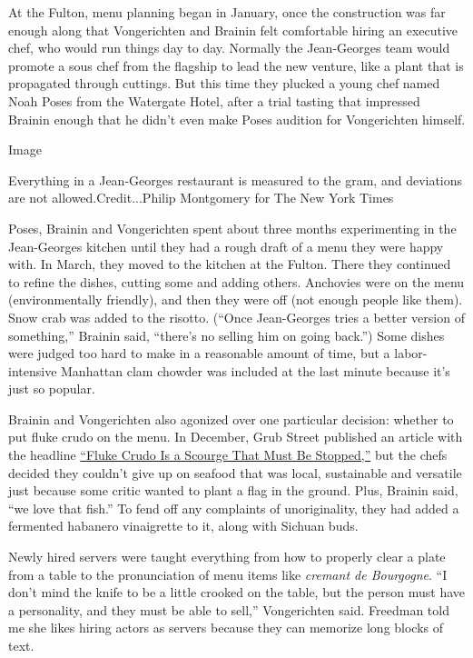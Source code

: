 At the Fulton, menu planning began in January, once the construction was
far enough along that Vongerichten and Brainin felt comfortable hiring
an executive chef, who would run things day to day. Normally the
Jean-Georges team would promote a sous chef from the flagship to lead
the new venture, like a plant that is propagated through cuttings. But
this time they plucked a young chef named Noah Poses from the Watergate
Hotel, after a trial tasting that impressed Brainin enough that he
didn't even make Poses audition for Vongerichten himself.

Image

Everything in a Jean-Georges restaurant is measured to the gram, and
deviations are not allowed.Credit...Philip Montgomery for The New York
Times

Poses, Brainin and Vongerichten spent about three months experimenting
in the Jean-Georges kitchen until they had a rough draft of a menu they
were happy with. In March, they moved to the kitchen at the Fulton.
There they continued to refine the dishes, cutting some and adding
others. Anchovies were on the menu (environmentally friendly), and then
they were off (not enough people like them). Snow crab was added to the
risotto. (``Once Jean-Georges tries a better version of something,''
Brainin said, ``there's no selling him on going back.'') Some dishes
were judged too hard to make in a reasonable amount of time, but a
labor-intensive Manhattan clam chowder was included at the last minute
because it's just so popular.

Brainin and Vongerichten also agonized over one particular decision:
whether to put fluke crudo on the menu. In December, Grub Street
published an article with the headline
\href{http://www.grubstreet.com/2018/12/fluke-crudo-scourge-nyc.html}{``Fluke
Crudo Is a Scourge That Must Be Stopped,''} but the chefs decided they
couldn't give up on seafood that was local, sustainable and versatile
just because some critic wanted to plant a flag in the ground. Plus,
Brainin said, ``we love that fish.'' To fend off any complaints of
unoriginality, they had added a fermented habanero vinaigrette to it,
along with Sichuan buds.

Newly hired servers were taught everything from how to properly clear a
plate from a table to the pronunciation of menu items like \emph{cremant
de Bourgogne}. ``I don't mind the knife to be a little crooked on the
table, but the person must have a personality, and they must be able to
sell,'' Vongerichten said. Freedman told me she likes hiring actors as
servers because they can memorize long blocks of text.


